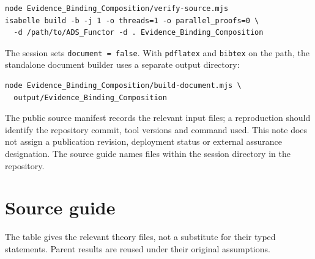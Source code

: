 \documentclass[10pt,a4paper]{article}
\newcommand{\code}[1]{\nolinkurl{#1}}
\begin{document}
{\small
\begin{verbatim}
node Evidence_Binding_Composition/verify-source.mjs
isabelle build -b -j 1 -o threads=1 -o parallel_proofs=0 \
  -d /path/to/ADS_Functor -d . Evidence_Binding_Composition
\end{verbatim}
}

The session sets \code{document = false}. With \code{pdflatex} and
\code{bibtex} on the path, the standalone document builder uses a separate
output directory:
{\small
\begin{verbatim}
node Evidence_Binding_Composition/build-document.mjs \
  output/Evidence_Binding_Composition
\end{verbatim}
}
The public source manifest records the relevant input files; a reproduction
should identify the repository commit, tool versions and command used.
This note does not assign a publication revision, deployment status or
external assurance designation. The source guide names files within the
session directory in the repository.

\clearpage
\appendix
\section{Source guide}
The table gives the relevant theory files, not a substitute for their typed
statements. Parent results are reused under their original assumptions.
\end{document}
